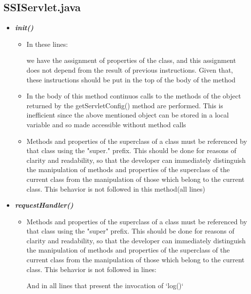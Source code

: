\documentclass[11pt,titlepage]{article} %
\begin{document}
  \subsection{SSIServlet.java}
    \begin{itemize}
      \item \textbf{\textit{init()}}
	\begin{itemize}
	 \item In these lines:
	    
	    
	    
	    we have the assignment of properties of the class, and this assignment does not
	    depend from the result of previous instructions. Given that, these instructions should be
	    put in the top of the body of the method
	 \item In the body of this method continuos calls to the methods of the object returned by the
	    getServletConfig() method are performed.
	    This is inefficient since the above mentioned object can be stored in a local variable
	    and so made accessible without method calls
	 \item Methods and properties of the superclass of a class must be referenced by that class using
	    the "super." prefix. This should be done for reasons of clarity and readability, so that
	    the developer can immediately distinguish the manipulation of methods and properties of the superclass of the current class
	    from the manipulation of those which belong to the current class.\newline
	    This behavior is not followed in this method(all lines)

	\end{itemize}

      \item \textbf{\textit{requestHandler()}}
	  \begin{itemize}
	      \item Methods and properties of the superclass of a class must be referenced by that class using
		the "super" prefix. This should be done for reasons of clarity and readability, so that
		the developer can immediately distinguish the manipulation of methods and properties of the superclass of the current class
		from the manipulation of those which belong to the current class.\newline
		This behavior is not followed in lines:
		
		And in all lines that present the invocation of `log()`


\end{itemize}
\end{itemize}
\end{document}
